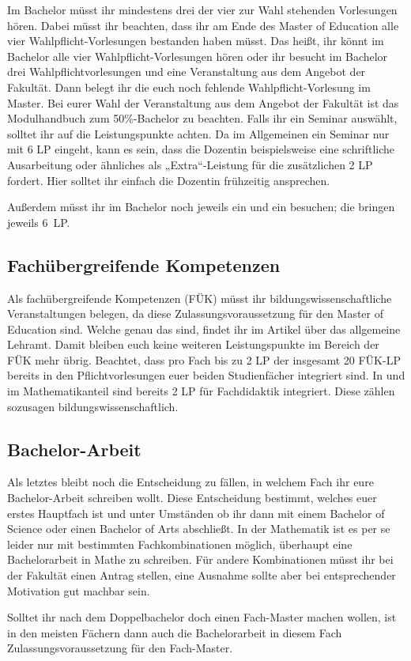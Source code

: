Im Bachelor müsst ihr mindestens drei der vier zur Wahl stehenden Vorlesungen hören. Dabei müsst ihr beachten, dass ihr am Ende des Master of Education alle vier Wahlpflicht-Vorlesungen bestanden haben müsst. Das heißt, ihr könnt im Bachelor alle vier Wahlpflicht-Vorlesungen hören oder ihr besucht im Bachelor drei Wahlpflichtvorlesungen und eine Veranstaltung aus dem Angebot der Fakultät. Dann belegt ihr die euch noch fehlende Wahlpflicht-Vorlesung im Master. Bei eurer Wahl der Veranstaltung aus dem Angebot der Fakultät ist das Modulhandbuch zum 50\%-Bachelor zu beachten. Falls ihr ein Seminar auswählt, solltet ihr auf die Leistungspunkte achten. Da im Allgemeinen ein Seminar nur mit 6 \gls{LP} eingeht, kann es sein, dass die Dozentin beispielsweise eine schriftliche Ausarbeitung oder ähnliches als „Extra“-Leistung für die zusätzlichen 2 \gls{LP} fordert. Hier solltet ihr einfach die Dozentin frühzeitig ansprechen.

Außerdem müsst ihr im Bachelor noch jeweils ein  und ein  besuchen; die bringen jeweils 6~\gls{LP}.

\subsection{Fachübergreifende Kompetenzen}

Als fachübergreifende Kompetenzen (FÜK) müsst ihr bildungswissenschaftliche Veranstaltungen belegen, da diese Zulassungsvoraussetzung für den Master of Education sind. Welche genau das sind, findet ihr im Artikel über das allgemeine Lehramt. Damit bleiben euch keine weiteren Leistungspunkte im Bereich der FÜK mehr übrig. Beachtet, dass pro Fach bis zu 2 \gls{LP} der insgesamt 20 FÜK-\gls{LP} bereits in den Pflichtvorlesungen euer beiden Studienfächer integriert sind. In  und  im Mathematikanteil sind bereits 2 \gls{LP} für Fachdidaktik integriert. Diese zählen sozusagen bildungswissenschaftlich.

\subsection{Bachelor-Arbeit}

Als letztes bleibt noch die Entscheidung zu fällen, in welchem Fach ihr eure Bachelor-Arbeit schreiben wollt. Diese Entscheidung bestimmt, welches euer erstes Hauptfach ist und unter Umständen ob ihr dann mit einem Bachelor of Science oder einen Bachelor of Arts abschließt. In der Mathematik ist es per se leider nur mit bestimmten Fachkombinationen möglich, überhaupt eine Bachelorarbeit in Mathe zu schreiben. Für andere Kombinationen müsst ihr bei der Fakultät einen Antrag stellen, eine Ausnahme sollte aber bei entsprechender Motivation gut machbar sein.

Solltet ihr nach dem Doppelbachelor doch einen Fach-Master machen wollen, ist in den meisten Fächern dann auch die Bachelorarbeit in diesem Fach Zulassungsvoraussetzung für den Fach-Master.